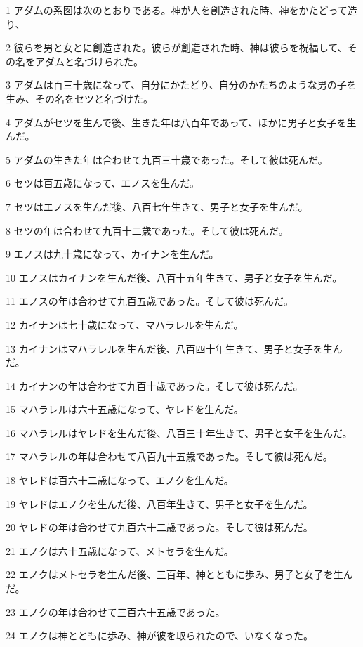 \par 1 アダムの系図は次のとおりである。神が人を創造された時、神をかたどって造り、
\par 2 彼らを男と女とに創造された。彼らが創造された時、神は彼らを祝福して、その名をアダムと名づけられた。
\par 3 アダムは百三十歳になって、自分にかたどり、自分のかたちのような男の子を生み、その名をセツと名づけた。
\par 4 アダムがセツを生んで後、生きた年は八百年であって、ほかに男子と女子を生んだ。
\par 5 アダムの生きた年は合わせて九百三十歳であった。そして彼は死んだ。
\par 6 セツは百五歳になって、エノスを生んだ。
\par 7 セツはエノスを生んだ後、八百七年生きて、男子と女子を生んだ。
\par 8 セツの年は合わせて九百十二歳であった。そして彼は死んだ。
\par 9 エノスは九十歳になって、カイナンを生んだ。
\par 10 エノスはカイナンを生んだ後、八百十五年生きて、男子と女子を生んだ。
\par 11 エノスの年は合わせて九百五歳であった。そして彼は死んだ。
\par 12 カイナンは七十歳になって、マハラレルを生んだ。
\par 13 カイナンはマハラレルを生んだ後、八百四十年生きて、男子と女子を生んだ。
\par 14 カイナンの年は合わせて九百十歳であった。そして彼は死んだ。
\par 15 マハラレルは六十五歳になって、ヤレドを生んだ。
\par 16 マハラレルはヤレドを生んだ後、八百三十年生きて、男子と女子を生んだ。
\par 17 マハラレルの年は合わせて八百九十五歳であった。そして彼は死んだ。
\par 18 ヤレドは百六十二歳になって、エノクを生んだ。
\par 19 ヤレドはエノクを生んだ後、八百年生きて、男子と女子を生んだ。
\par 20 ヤレドの年は合わせて九百六十二歳であった。そして彼は死んだ。
\par 21 エノクは六十五歳になって、メトセラを生んだ。
\par 22 エノクはメトセラを生んだ後、三百年、神とともに歩み、男子と女子を生んだ。
\par 23 エノクの年は合わせて三百六十五歳であった。
\par 24 エノクは神とともに歩み、神が彼を取られたので、いなくなった。
